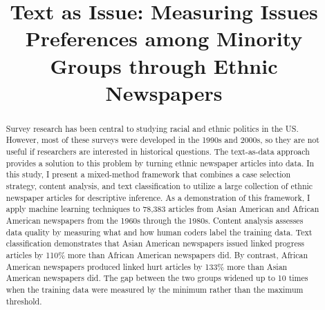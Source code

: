 \documentclass[12 pt]{article}
\title{Text as Issue: Measuring Issues Preferences among Minority Groups through Ethnic Newspapers}
\date{}
\author{}
\begin{document}
\maketitle       

\singlespacing

\begin{abstract}
\noindent 
Survey research has been central to studying racial and ethnic politics in the US. However, most of these surveys were developed in the 1990s and 2000s, so they are not useful if researchers are interested in historical questions. The text-as-data approach provides a solution to this problem by turning ethnic newspaper articles into data. In this study, I present a mixed-method framework that combines a case selection strategy, content analysis, and text classification to utilize a large collection of ethnic newspaper articles for descriptive inference. As a demonstration of this framework, I apply machine learning techniques to 78,383 articles from Asian American and African American newspapers from the 1960s through the 1980s. Content analysis assesses data quality by measuring what and how human coders label the training data. Text classification demonstrates that Asian American newspapers issued linked progress articles by 110\% more than African American newspapers did. By contrast, African American newspapers produced linked hurt articles by 133\% more than Asian American newspapers did. The gap between the two groups widened up to 10 times when the training data were measured by the minimum rather than the maximum threshold.
\end{abstract}

\thispagestyle{empty}

\makeatletter
\clearpage


\doublespacing
\end{document}

